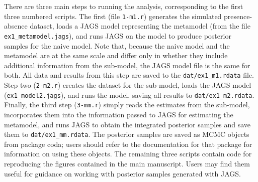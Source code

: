 \documentclass[11pt]{article}
\begin{document}
There are three main steps to running the analysis, corresponding to the first three numbered scripts.
The first (file {\tt 1-m1.r}) generates the simulated presence-absence dataset, loads a JAGS model representing the metamodel (from the file {\tt ex1\_metamodel.jags}), and runs JAGS on the model to produce posterior samples for the naive model.
Note that, because the naive model and the metamodel are at the same scale and differ only in whether they include additional information from the sub-model, the JAGS model file is the same for both.
All data and results from this step are saved to the {\tt dat/ex1\_m1.rdata} file.
Step two ({\tt 2-m2.r}) creates the dataset for the sub-model, loads the JAGS model ({\tt ex1\_model2.jags}), and runs the model, saving all results to {\tt dat/ex1\_m2.rdata}.
Finally, the third step ({\tt 3-mm.r}) simply reads the estimates from the sub-model, incorporates them into the information passed to JAGS for estimating the metamodel, and runs JAGS to obtain the integrated posterior samples and save them to {\tt dat/ex1\_mm.rdata}.
The posterior samples are saved as MCMC objects from package coda; users should refer to the documentation for that package for information on using these objects.
The remaining three scripts contain code for reproducing the figures contained in the main manuscript.
Users may find them useful for guidance on working with posterior samples generated with JAGS.
\end{document}
